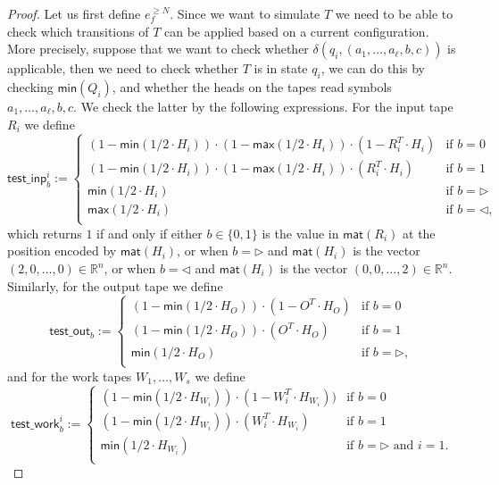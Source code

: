 \begin{proof}
    Let us first define $e_f^{\geq N}$. Since we want to simulate $T$ we need to be able to check which 
    transitions of $T$ can be applied based on a current configuration. More precisely,
    suppose that we want to check whether $\delta(q_i,(a_1,\ldots,a_{\ell},b,c))$ is applicable, then we 
    need to check whether $T$ is in state $q_i$, we can do this by checking 
    $\mathsf{min}(Q_i)$, and whether the heads on the tapes read symbols $a_1,\ldots,a_{\ell},b,c$. We 
    check the latter by the following expressions.
    For the input tape $R_i$ we define
    $$
    \mathsf{test\_inp}^i_b:=\begin{cases}
    (1-\mathsf{min}(1/2\cdot H_i))\cdot(1-\mathsf{max}(1/2\cdot H_i))\cdot(1- R_i^T\cdot H_i) & \text{if $b=0$}\\
    (1-\mathsf{min}(1/2\cdot H_i))\cdot(1-\mathsf{max}(1/2\cdot H_i))\cdot(R_i^T\cdot H_i) & \text{if $b=1$}\\
    \mathsf{min}(1/2\cdot H_i) & \text{if $b=\rhd$}\\
    \mathsf{max}(1/2\cdot H_i) & \text{if $b=\lhd$},\\
    \end{cases}
    $$
    which returns $1$ if and only if either $b\in\{0,1\}$ is the value in $\mathsf{mat}(R_i)$ at the 
    position encoded by $\mathsf{mat}(H_i)$, or when $b=\rhd$ and $\mathsf{mat}(H_i)$ is the vector 
    $(2,0,\ldots,0)\in\mathbb{R}^n$, or when $b=\lhd$ and $\mathsf{mat}(H_i)$ is the vector 
    $(0,0,\ldots,2)\in\mathbb{R}^n$. Similarly, for the output tape we define
    $$
    \mathsf{test\_out}_b:=\begin{cases}
    (1-\mathsf{min}(1/2\cdot H_O))\cdot(1- O^T\cdot H_O) & \text{if $b=0$}\\
    (1-\mathsf{min}(1/2\cdot H_O))\cdot(O^T\cdot H_O) & \text{if $b=1$}\\
    \mathsf{min}(1/2\cdot H_O) & \text{if $b=\rhd$},\\
    \end{cases}
    $$
    and for the work tapes $W_1,\ldots,W_s$ we define
    $$
    \mathsf{test\_work}^i_b:=\begin{cases}
    (1-\mathsf{min}(1/2\cdot H_{W_i}))\cdot(1- W_i^T\cdot H_{W_i})) & \text{if $b=0$}\\
    (1-\mathsf{min}(1/2\cdot H_{W_i}))\cdot (W_i^T\cdot H_{W_i}) & \text{if $b=1$}\\
    \mathsf{min}(1/2\cdot H_{W_i}) & \text{if $b=\rhd$ and $i=1$}.\\
    \end{cases}
$$
\end{proof}
